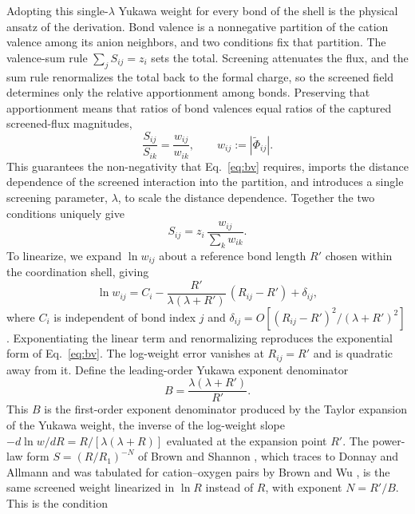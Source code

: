 \documentclass[aps,prmaterials,twocolumn,10pt,superscriptaddress,floatfix]{revtex4-2}
\begin{document}
Adopting this single-$\lambda$ Yukawa weight for every bond of the
shell is the physical ansatz of the derivation.
Bond valence is a nonnegative partition of the cation valence among its
anion neighbors, and two conditions fix that partition.  The
valence-sum rule $\sum_j S_{ij}=z_i$ sets the total.
Screening attenuates the flux, and the sum rule renormalizes
the total back to the formal charge, so the screened field determines only the
relative apportionment among bonds.  Preserving that
apportionment means that ratios of bond valences equal ratios of the
captured screened-flux magnitudes,
\begin{equation*}
\frac{S_{ij}}{S_{ik}}=\frac{w_{ij}}{w_{ik}},
\qquad w_{ij}:=|\widetilde\Phi_{ij}|.
\end{equation*}
This guarantees the non-negativity that Eq.~\eqref{eq:bv} requires,
imports the distance dependence of the screened interaction into the
partition, and introduces a single screening parameter, $\lambda$, to
scale the distance dependence.  Together the two conditions uniquely give
\begin{equation}\label{eq:partition}
S_{ij}=z_i\,\frac{w_{ij}}{\sum_k w_{ik}}.
\end{equation}
To linearize, we expand $\ln w_{ij}$ about a reference bond length $R'$
chosen within the coordination shell, giving
\begin{equation}\label{eq:expansion}
\ln w_{ij}= C_i - \frac{R'}{\lambda(\lambda+R')}\,(R_{ij}-R')+\delta_{ij},
\end{equation}
where $C_i$ is independent of bond index $j$ and
$\delta_{ij}=O[(R_{ij}-R')^2/(\lambda+R')^2]$.
Exponentiating the linear term and renormalizing reproduces the
exponential form of Eq.~\eqref{eq:bv}.  The log-weight error
vanishes at $R_{ij}=R'$ and is quadratic away from it.  Define the
leading-order Yukawa exponent denominator
\begin{equation}\label{eq:B_composite}
B = \frac{\lambda(\lambda+R')}{R'}.
\end{equation}
This $B$ is the first-order exponent denominator produced by the Taylor
expansion of the Yukawa weight, the inverse of the log-weight slope
$-d\ln w/dR=R/[\lambda(\lambda+R)]$ evaluated at the expansion point
$R'$.  The power-law form $S=(R/R_1)^{-N}$ of Brown and Shannon
\cite{Brown1973}, which traces to Donnay and Allmann
\cite{Donnay1970} and was tabulated for cation--oxygen pairs by Brown
and Wu \cite{Brown1976}, is the same screened weight linearized in
$\ln R$ instead of $R$, with exponent $N=R'/B$.  This is the condition
\end{document}
